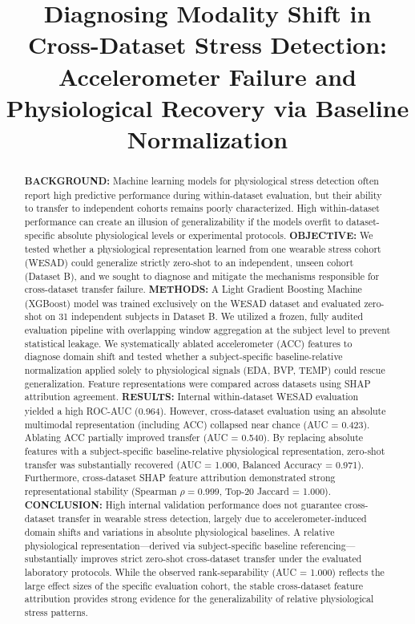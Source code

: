 \documentclass[journal]{IEEEtran}
\begin{document}
\title{Diagnosing Modality Shift in Cross-Dataset Stress Detection: Accelerometer Failure and Physiological Recovery via Baseline Normalization}

\author{
}

\maketitle

\begin{abstract}
\textbf{BACKGROUND:} Machine learning models for physiological stress detection often report high predictive performance during within-dataset evaluation, but their ability to transfer to independent cohorts remains poorly characterized. High within-dataset performance can create an illusion of generalizability if the models overfit to dataset-specific absolute physiological levels or experimental protocols.
\textbf{OBJECTIVE:} We tested whether a physiological representation learned from one wearable stress cohort (WESAD) could generalize strictly zero-shot to an independent, unseen cohort (Dataset B), and we sought to diagnose and mitigate the mechanisms responsible for cross-dataset transfer failure.
\textbf{METHODS:} A Light Gradient Boosting Machine (XGBoost) model was trained exclusively on the WESAD dataset and evaluated zero-shot on 31 independent subjects in Dataset B. We utilized a frozen, fully audited evaluation pipeline with overlapping window aggregation at the subject level to prevent statistical leakage. We systematically ablated accelerometer (ACC) features to diagnose domain shift and tested whether a subject-specific baseline-relative normalization applied solely to physiological signals (EDA, BVP, TEMP) could rescue generalization. Feature representations were compared across datasets using SHAP attribution agreement.
\textbf{RESULTS:} Internal within-dataset WESAD evaluation yielded a high ROC-AUC (0.964). However, cross-dataset evaluation using an absolute multimodal representation (including ACC) collapsed near chance (AUC = 0.423). Ablating ACC partially improved transfer (AUC = 0.540). By replacing absolute features with a subject-specific baseline-relative physiological representation, zero-shot transfer was substantially recovered (AUC = 1.000, Balanced Accuracy = 0.971). Furthermore, cross-dataset SHAP feature attribution demonstrated strong representational stability (Spearman $\rho = 0.999$, Top-20 Jaccard = 1.000).
\textbf{CONCLUSION:} High internal validation performance does not guarantee cross-dataset transfer in wearable stress detection, largely due to accelerometer-induced domain shifts and variations in absolute physiological baselines. A relative physiological representation—derived via subject-specific baseline referencing—substantially improves strict zero-shot cross-dataset transfer under the evaluated laboratory protocols. While the observed rank-separability (AUC = 1.000) reflects the large effect sizes of the specific evaluation cohort, the stable cross-dataset feature attribution provides strong evidence for the generalizability of relative physiological stress patterns.
\end{abstract}
\end{document}

